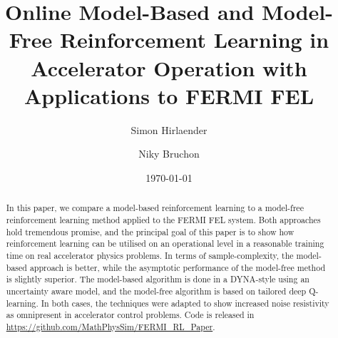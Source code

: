 \documentclass[
reprint,
amsmath,amssymb,amsfonts,clevref,
aps,
prstab,
]{revtex4-2}
\begin{document}
	
	
	
	
	\title{Online Model-Based and Model-Free Reinforcement Learning in Accelerator Operation with Applications to FERMI FEL}
	
	
	
	\author{Simon Hirlaender}
	\author{Niky Bruchon}%
	
	\date{\today}%
	
	
	\begin{abstract}
		In this paper, we compare a model-based reinforcement learning to a model-free reinforcement learning method applied to the FERMI FEL system. Both approaches hold tremendous promise, and the principal goal of this paper is to show how reinforcement learning can be utilised on an operational level in a reasonable training time on real accelerator physics problems. In terms of sample-complexity, the model-based approach is better, while the asymptotic performance of the model-free method is slightly superior. The model-based algorithm is done in a DYNA-style using an uncertainty aware model, and the model-free algorithm is based on tailored deep Q-learning. In both cases, the techniques were adapted to show increased noise resistivity as omnipresent in accelerator control problems. Code is released in \url{https://github.com/MathPhysSim/FERMI_RL_Paper}.
		
	\end{abstract}
	\maketitle

\end{document}
